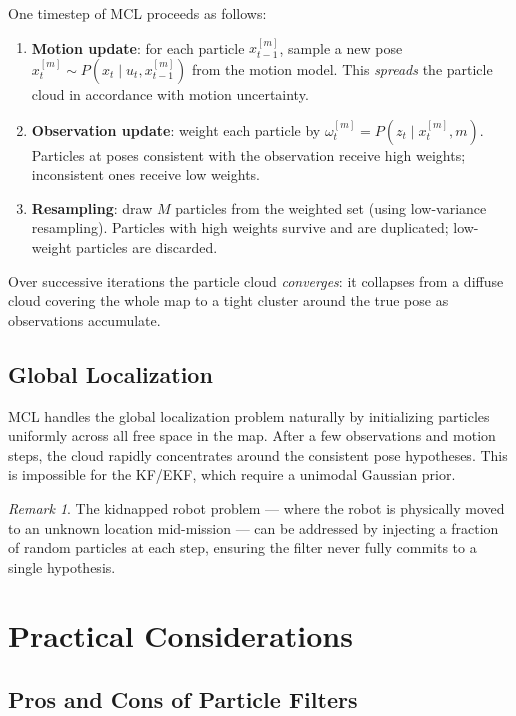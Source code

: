 \documentclass[11pt,a4paper]{article}
\theoremstyle{definition}
\theoremstyle{plain}
\theoremstyle{remark}
\newtheorem*{remark}{Remark}
\begin{document}
One timestep of MCL proceeds as follows:

\begin{enumerate}
    \item \textbf{Motion update}: for each particle $x_{t-1}^{[m]}$, sample a new pose $x_t^{[m]} \sim P(x_t \mid u_t, x_{t-1}^{[m]})$ from the motion model. This \textit{spreads} the particle cloud in accordance with motion uncertainty.
    \item \textbf{Observation update}: weight each particle by $\omega_t^{[m]} = P(z_t \mid x_t^{[m]}, m)$. Particles at poses consistent with the observation receive high weights; inconsistent ones receive low weights.
    \item \textbf{Resampling}: draw $M$ particles from the weighted set (using low-variance resampling). Particles with high weights survive and are duplicated; low-weight particles are discarded.
\end{enumerate}

Over successive iterations the particle cloud \textit{converges}: it collapses from a diffuse cloud covering the whole map to a tight cluster around the true pose as observations accumulate.

\subsection{Global Localization}

MCL handles the global localization problem naturally by initializing particles uniformly across all free space in the map. After a few observations and motion steps, the cloud rapidly concentrates around the consistent pose hypotheses. This is impossible for the KF/EKF, which require a unimodal Gaussian prior.

\begin{remark}
The kidnapped robot problem — where the robot is physically moved to an unknown location mid-mission — can be addressed by injecting a fraction of random particles at each step, ensuring the filter never fully commits to a single hypothesis.
\end{remark}

\section{Practical Considerations}

\subsection{Pros and Cons of Particle Filters}
\end{document}

